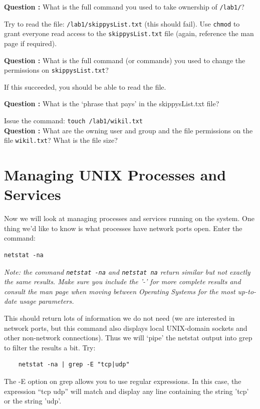 \documentclass{article}
\begin{document}
\textbf{Question :} What is the full command you used to take ownership of {\tt /lab1/}?\medskip
\addtocounter{Question}{1}

Try to read the file: {\tt /lab1/skippysList.txt} (this should fail). Use {\tt chmod} to grant everyone read access to the {\tt skippysList.txt} file (again, reference the man page if required).

\textbf{Question :} What is the full command (or commands) you used to change the permissions on {\tt skippysList.txt}?\medskip
\addtocounter{Question}{1}

If this succeeded, you should be able to read the file.

\textbf{Question :} What is the `phrase that pays’ in the skippysList.txt file?\medskip
\addtocounter{Question}{1}

Issue the command: {\tt touch /lab1/wikil.txt}\\

\textbf{Question :} What are the owning user and group and the file permissions on the file {\tt wikil.txt}? What is the file size?\medskip
\addtocounter{Question}{1}

\section{Managing UNIX Processes and Services}

Now we will look at managing processes and services running on the system. One thing we’d like to know is what processes have network ports open. Enter the command:
\begin{verbatim}
netstat -na
\end{verbatim}
\textit{Note: the command {\tt netstat -na} and {\tt netstat na} return similar but not exactly the same results. Make sure you include the '-' for more complete results and consult the man page when moving between Operating Systems for the most up-to-date usage parameters.}\medskip

This should return lots of information we do not need (we are interested in network ports, but this command also displays local UNIX-domain sockets and other non-network connections). Thus we will `pipe’ the netstat output into grep to filter the results a bit. Try:
\begin{verbatim}
	netstat -na | grep -E "tcp|udp"
\end{verbatim}

The -E option on grep allows you to use regular expressions. In this case, the expression ``tcp  udp'' 
will match and display any line containing the string 'tcp' or the string 'udp'. \medskip
\end{document}
